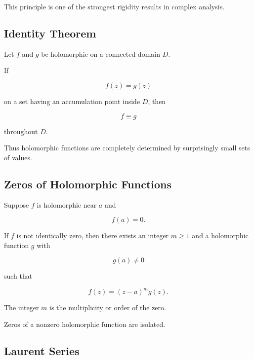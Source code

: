 This principle is one of the strongest rigidity results in complex
analysis.

\subsection{Identity Theorem}
\label{subsec:identity-theorem-complex}

\begin{theorem}
Let \(f\) and \(g\) be holomorphic on a connected domain \(D\).

If

\[
f(z)=g(z)
\]

on a set having an accumulation point inside \(D\), then

\[
\boxed{
f\equiv g
}
\]

throughout \(D\).
\end{theorem}

Thus holomorphic functions are completely determined by surprisingly
small sets of values.

\subsection{Zeros of Holomorphic Functions}
\label{subsec:zeros-holomorphic}

Suppose \(f\) is holomorphic near \(a\) and

\[
f(a)=0.
\]

If \(f\) is not identically zero, then there exists an integer \(m\geq1\)
and a holomorphic function \(g\) with

\[
g(a)\neq0
\]

such that

\[
\boxed{
f(z)
=
(z-a)^m g(z).
}
\]

The integer \(m\) is the multiplicity or order of the zero.

Zeros of a nonzero holomorphic function are isolated.

\subsection{Laurent Series}
\label{subsec:laurent-series}

